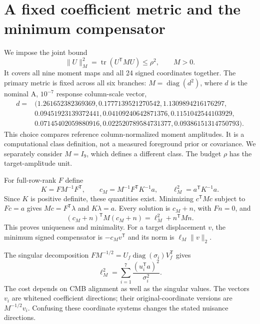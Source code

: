 \documentclass[aps,prd,onecolumn,11pt,nofootinbib,notitlepage]{revtex4-2}
\newcommand{\tr}{\operatorname{tr}}
\begin{document}
\section{A fixed coefficient metric and the minimum compensator}

We impose the joint bound
\begin{equation}
 \|U\|_M^2=\tr(U^{\mathsf T}MU)\le\rho^2,\qquad M>0.
 \label{eq:budget}
\end{equation}
It covers all nine moment maps and all 24 signed coordinates together. The primary metric is fixed across all six branches: $M=\operatorname{diag}(d^2)$, where $d$ is the nominal A, $10^{-7}$ response column-scale vector,
\begin{align}
 d={}&(1.261652382369369,0.1777139521270542,1.1309894216176297,\nonumber\\
 &0.09451923139372441,0.04109240642871376,0.1151042544103929,\nonumber\\
 &0.07145402059880916,0.022520789584731377,0.09386151314750793).
\end{align}
This choice compares reference column-normalized moment amplitudes. It is a computational class definition, not a measured foreground prior or covariance. We separately consider $M=I_9$, which defines a different class. The budget $\rho$ has the target-amplitude unit.

For full-row-rank $F$ define
\begin{equation}
 K=FM^{-1}F^{\mathsf T},\qquad
 c_M=M^{-1}F^{\mathsf T}K^{-1}a,\qquad
 \ell_M^2=a^{\mathsf T}K^{-1}a.
 \label{eq:minimum}
\end{equation}
Since $K$ is positive definite, these quantities exist. Minimizing $c^{\mathsf T}Mc$ subject to $Fc=a$ gives $Mc=F^{\mathsf T}\lambda$ and $K\lambda=a$. Every solution is $c_M+n$, with $Fn=0$, and
\begin{equation}
 (c_M+n)^{\mathsf T}M(c_M+n)=\ell_M^2+n^{\mathsf T}Mn.
 \label{eq:orthogonality}
\end{equation}
This proves uniqueness and minimality. For a target displacement $v$, the minimum signed compensator is $-c_Mv^{\mathsf T}$ and its norm is $\ell_M\|v\|_2$.

The singular decomposition $FM^{-1/2}=U_f\operatorname{diag}(\sigma_i)V_f^{\mathsf T}$ gives
\begin{equation}
 \ell_M^2=\sum_{i=1}^7\frac{(u_i^{\mathsf T}a)^2}{\sigma_i^2}.
 \label{eq:singular}
\end{equation}
The cost depends on CMB alignment as well as the singular values. The vectors $v_i$ are whitened coefficient directions; their original-coordinate versions are $M^{-1/2}v_i$. Confusing these coordinate systems changes the stated nuisance directions.
\end{document}
